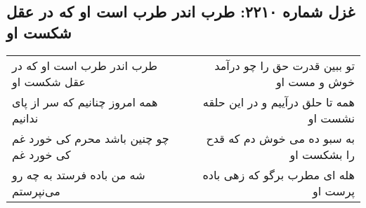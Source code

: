 \begin{center}
\section*{غزل شماره ۲۲۱۰: طرب اندر طرب است او که در عقل شکست او}
\label{sec:2210}
\begin{longtable}{l p{0.5cm} r}
طرب اندر طرب است او که در عقل شکست او
&&
تو ببین قدرت حق را چو درآمد خوش و مست او
\\
همه امروز چنانیم که سر از پای ندانیم
&&
همه تا حلق درآییم و در این حلقه نشست او
\\
چو چنین باشد محرم کی خورد غم کی خورد غم
&&
به سبو ده می خوش دم که قدح را بشکست او
\\
شه من باده فرستد به چه رو می‌نپرستم
&&
هله ای مطرب برگو که زهی باده پرست او
\\
\end{longtable}
\end{center}
